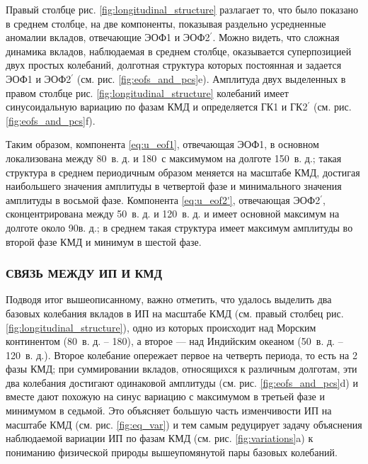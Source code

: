 Правый столбце рис. \ref{fig:longitudinal_structure} разлагает то, что было показано в среднем столбце, на две компоненты, показывая раздельно усредненные аномалии вкладов, отвечающие ЭОФ1 и ЭОФ2$^\prime$. Можно видеть, что сложная динамика вкладов, наблюдаемая в среднем столбце, оказывается суперпозицией двух простых колебаний, долготная структура которых постоянная и задается ЭОФ1 и ЭОФ2$^\prime$ (см. рис. \ref{fig:eofs_and_pcs}{e}). Амплитуда двух выделенных в правом столбце рис. \ref{fig:longitudinal_structure} колебаний имеет синусоидальную вариацию по фазам КМД и определяется ГК1 и ГК2$^\prime$ (см. рис. \ref{fig:eofs_and_pcs}{f}).

Таким образом, компонента \eqref{eq:u_eof1}, отвечающая ЭОФ1, в основном локализована между 80\textdegree\ в. д. и 180\textdegree\ с максимумом на долготе 150\textdegree\ в. д.; такая структура в среднем периодичным образом меняется на масштабе КМД, достигая наибольшего значения амплитуды в четвертой фазе и минимального значения амплитуды в восьмой фазе. Компонента \eqref{eq:u_eof2'}, отвечающая ЭОФ2$^\prime$, сконцентрирована между 50\textdegree\ в. д. и 120\textdegree\ в. д. и имеет основной максимум на долготе около 90\textdegree в. д.; в среднем такая структура имеет максимум амплитуды во второй фазе КМД и минимум в шестой фазе.

\subsubsection{СВЯЗЬ МЕЖДУ ИП И КМД}

Подводя итог вышеописанному, важно отметить, что удалось выделить два базовых колебания вкладов в ИП на масштабе КМД (см. правый столбец рис. \ref{fig:longitudinal_structure}), одно из которых происходит над Морским континентом (80\textdegree\ в. д. -- 180\textdegree), а второе --- над Индийским океаном (50\textdegree\ в. д. -- 120\textdegree\ в. д.). Второе колебание опережает первое на четверть периода, то есть на 2 фазы КМД; при суммировании вкладов, относящихся к различным долготам, эти два колебания достигают одинаковой амплитуды (см. рис. \ref{fig:eofs_and_pcs}{d}) и вме{}сте дают похожую на синус вариацию с максимумом в третьей фазе и минимумом в седьмой. Это объясняет большую часть изменчивости ИП на масштабе КМД (см. рис. \ref{fig:eq_var}) и тем самым редуцирует задачу объяснения наблюдаемой вариации ИП по фазам КМД (см. рис. \ref{fig:variations}{a}) к пониманию физической природы вышеупомянутой пары базовых колебаний.

